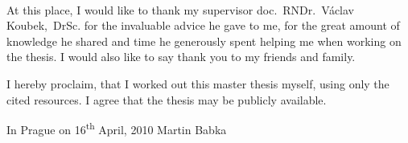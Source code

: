 \normalsize
\setcounter{page}{2}
\ \vspace{10mm} 

\noindent At this place, I would like to thank my supervisor doc.~RNDr.~Václav Koubek,~DrSc. for the invaluable advice he gave to me, for the great amount of knowledge he shared and time he generously spent helping me when working on the thesis. I would also like to say thank you to my friends and family.

\vspace{\fill}
\noindent I hereby proclaim, that I worked out this master thesis myself, using only the cited resources. I agree that the thesis may be publicly available.

\bigskip
\noindent In Prague on 16\textsuperscript{th} April, 2010 \hspace{\fill}Martin Babka

\tableofcontents 

\newpage 

